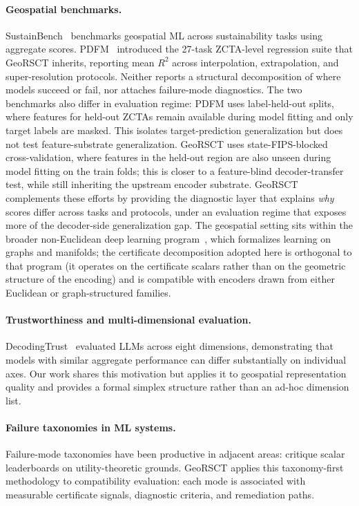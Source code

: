 \documentclass{article}
\begin{document}
\paragraph{Geospatial benchmarks.} SustainBench~\citep{yeh2021sustainbench} benchmarks geospatial ML across sustainability tasks using aggregate scores. PDFM~\citep{agarwal2025pdfm} introduced the 27-task ZCTA-level regression suite that GeoRSCT inherits, reporting mean $R^2$ across interpolation, extrapolation, and super-resolution protocols. Neither reports a structural decomposition of where models succeed or fail, nor attaches failure-mode diagnostics. The two benchmarks also differ in evaluation regime: PDFM uses label-held-out splits, where features for held-out ZCTAs remain available during model fitting and only target labels are masked. This isolates target-prediction generalization but does not test feature-substrate generalization. GeoRSCT uses state-FIPS-blocked cross-validation, where features in the held-out region are also unseen during model fitting on the train folds; this is closer to a feature-blind decoder-transfer test, while still inheriting the upstream encoder substrate. GeoRSCT complements these efforts by providing the diagnostic layer that explains \emph{why} scores differ across tasks and protocols, under an evaluation regime that exposes more of the decoder-side generalization gap. The geospatial setting sits within the broader non-Euclidean deep learning program~\citep{bronstein2017geometric}, which formalizes learning on graphs and manifolds; the certificate decomposition adopted here is orthogonal to that program (it operates on the certificate scalars rather than on the geometric structure of the encoding) and is compatible with encoders drawn from either Euclidean or graph-structured families.

\paragraph{Trustworthiness and multi-dimensional evaluation.} DecodingTrust~\citep{wang2023decodingtrust} evaluated LLMs across eight dimensions, demonstrating that models with similar aggregate performance can differ substantially on individual axes. Our work shares this motivation but applies it to geospatial representation quality and provides a formal simplex structure rather than an ad-hoc dimension list.

\paragraph{Failure taxonomies in ML systems.} Failure-mode taxonomies have been productive in adjacent areas: \citet{ethayarajh2020utility} critique scalar leaderboards on utility-theoretic grounds. GeoRSCT applies this taxonomy-first methodology to compatibility evaluation: each mode is associated with measurable certificate signals, diagnostic criteria, and remediation paths.
\end{document}
